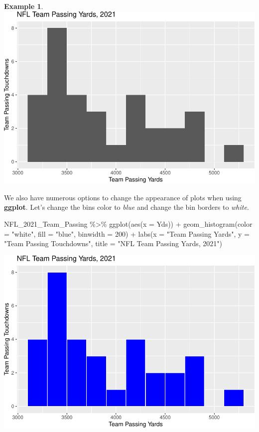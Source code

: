 \documentclass[
  11pt,
]{book}
\newenvironment{Shaded}{\begin{snugshade}}{\end{snugshade}}
\newcommand{\AttributeTok}[1]{\textcolor[rgb]{0.77,0.63,0.00}{#1}}
\newcommand{\DecValTok}[1]{\textcolor[rgb]{0.00,0.00,0.81}{#1}}
\newcommand{\FunctionTok}[1]{\textcolor[rgb]{0.00,0.00,0.00}{#1}}
\newcommand{\NormalTok}[1]{#1}
\newcommand{\SpecialCharTok}[1]{\textcolor[rgb]{0.00,0.00,0.00}{#1}}
\newcommand{\StringTok}[1]{\textcolor[rgb]{0.31,0.60,0.02}{#1}}
\theoremstyle{definition}
\theoremstyle{definition}
\newtheorem{example}{Example}[chapter]
\theoremstyle{definition}
\theoremstyle{definition}
\theoremstyle{remark}
\begin{document}
\begin{example}
\includegraphics{series_files/figure-latex/hist2-1.pdf}

\vfill
\newpage

We also have numerous options to change the appearance of plots when using \textbf{ggplot}. Let's change the bins color to \emph{blue} and change the bin borders to \emph{white}.

\begin{Shaded}
\begin{Highlighting}[]
\NormalTok{NFL\_2021\_Team\_Passing }\SpecialCharTok{\%\textgreater{}\%}
    \FunctionTok{ggplot}\NormalTok{(}\FunctionTok{aes}\NormalTok{(}\AttributeTok{x =}\NormalTok{ Yds)) }\SpecialCharTok{+} \FunctionTok{geom\_histogram}\NormalTok{(}\AttributeTok{color =} \StringTok{"white"}\NormalTok{, }\AttributeTok{fill =} \StringTok{"blue"}\NormalTok{, }\AttributeTok{binwidth =} \DecValTok{200}\NormalTok{) }\SpecialCharTok{+}
    \FunctionTok{labs}\NormalTok{(}\AttributeTok{x =} \StringTok{"Team Passing Yards"}\NormalTok{, }\AttributeTok{y =} \StringTok{"Team Passing Touchdowns"}\NormalTok{, }\AttributeTok{title =} \StringTok{"NFL Team Passing Yards, 2021"}\NormalTok{)}
\end{Highlighting}
\end{Shaded}

\includegraphics{series_files/figure-latex/hist3-1.pdf}
\end{example}
\end{document}
